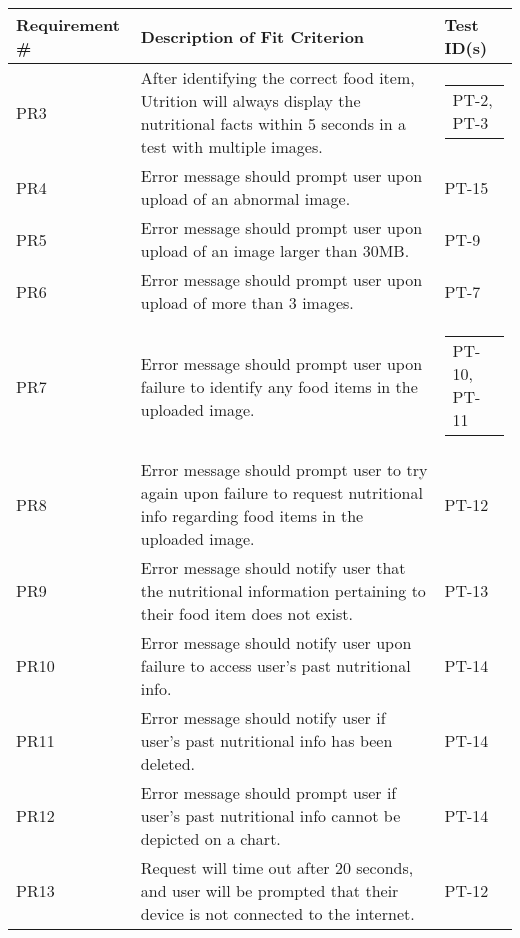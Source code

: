 \documentclass[12pt, titlepage]{article}
\begin{document}
	\begin{table}[H]
		\begin{tabularx}{\textwidth}{|l|X|l|}
			\hline
			{\bf Requirement \#} & {\bf Description of Fit Criterion} & {\bf Test ID(s)}\\
			\hline
			PR3 & After identifying the correct food item, Utrition will always 
			display the nutritional facts within 5 seconds in a test with 
			multiple images. & \begin{tabular}[c]{@{}l@{}}
				PT-2, PT-3\end{tabular}\\
			\hline
			PR4 & Error message should prompt user upon upload of an abnormal 
			image. & PT-15\\
			\hline
			PR5 & Error message should prompt user upon upload of an image 
			larger than 30MB. & PT-9\\
			\hline
			PR6 & Error message should prompt user upon upload of more than 3 
			images. & PT-7\\
			\hline
			PR7 & Error message should prompt user upon failure to identify 
			any food items in the uploaded image. & 
			\begin{tabular}[c]{@{}l@{}}PT-10, PT-11 
			\end{tabular}\\
			\hline
			PR8 & Error message should prompt user to try again upon failure 
			to request nutritional info regarding food items in the uploaded image. & PT-12\\
			\hline
			PR9 & Error message should notify user that the nutritional 
			information pertaining to their food item does not exist. & PT-13\\
			\hline
			PR10 & Error message should notify user upon failure to access 
			user's past nutritional info. & PT-14\\
			\hline
			PR11 & Error message should notify user if user's past nutritional 
			info has been deleted. & PT-14\\
			\hline
			PR12 & Error message should prompt user if user's past nutritional 
			info cannot be depicted on a chart. & PT-14\\
			\hline
			PR13 & Request will time out after 20 seconds, and user will be 
			prompted that their device is not connected to the internet. & PT-12\\
			\hline
		\end{tabularx}
	\end{table}
	
\end{document}
